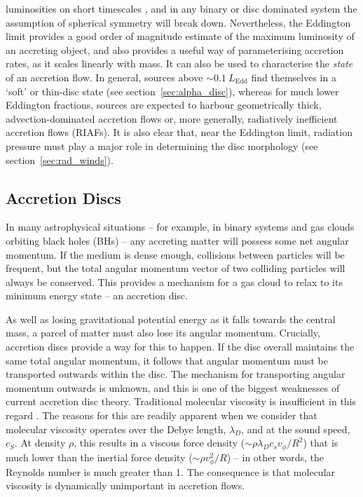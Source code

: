 luminosities on short timescales 
\citep[see, e.g.,][among many, many Astronomer's Telegrams]{kuulkers_atel2015,motta_atel2015}, 
and in any binary
or disc dominated system the assumption of spherical symmetry will
break down. Nevertheless, the Eddington limit provides a good order of magnitude 
estimate of the maximum luminosity of an accreting object,
and also provides a useful way of parameterising accretion rates,
as it scales linearly with mass. It can also be used
to characterise the {\em state} of an accretion flow.  
In general, sources above $\sim 0.1~L_{\mathrm{Edd}}$ find themselves in a 
`soft' or thin-disc state (see section~\ref{sec:alpha_disc}), 
whereas for much lower Eddington 
fractions, sources are expected to harbour geometrically thick, 
advection-dominated accretion flows
\citep[ADAFs; ][]{narayan1994,narayan1995} or, more generally, 
radiatively inefficient accretion flows (RIAFs).
It is also clear that, near the Eddington limit, radiation pressure
must play a major role in determining the disc morphology 
(see section~\ref{sec:rad_winds}).

\subsection{Accretion Discs}

In many astrophysical situations -- for example, 
in binary systems and gas clouds orbiting black holes (BHs) --
any accreting matter will possess some net angular momentum.
If the medium is dense enough, collisions between particles will be
frequent, but the total angular momentum vector of two colliding particles
will always be conserved. This provides a mechanism for a gas cloud to relax to 
its minimum energy state -- an accretion disc. 

As well as losing gravitational potential energy as it falls towards 
the central mass, a parcel of matter must also lose its angular momentum. 
Crucially, accretion discs provide a way for this to happen. 
If the disc overall maintains the same total 
angular momentum, it follows that angular momentum must 
be transported outwards within the disc. The mechanism for transporting 
angular momentum outwards is unknown, and this is one of the biggest 
weaknesses of current accretion disc theory. 
Traditional molecular viscosity is insufficient in this regard 
\citep{pringle1981}. The reasons for this are readily apparent
when we consider that molecular viscosity operates over the Debye length,
$\lambda_D$, and at the sound speed, $c_S$. At density $\rho$, this results in a 
viscous force density ($\sim \rho \lambda_D c_s v_\phi/R^2$) that is much lower 
than the inertial force density ($\sim \rho v_\phi^2/R$) --
in other words, the Reynolds number is much greater than 1. The consequence is that
molecular viscosity is dynamically unimportant in accretion flows.

